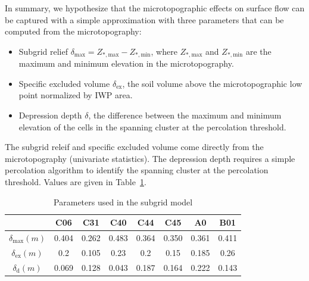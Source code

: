 \documentclass[review,11pt]{elsarticle}
\begin{document}
In summary, we hypothesize that the microtopographic effects on surface flow can be captured with a simple approximation with three parameters that can be computed from the microtopography:

\begin{itemize}
\item Subgrid relief $\delta_\text{max} = Z_{*,\text{max}} -   Z_{*,\text{min}}$, where  $Z_{*,\text{max}}$ and  $Z_{*,\text{min}}$ are the maximum and minimum elevation in the microtopography. 
\item Specific excluded volume $\delta_\text{ex}$, the soil volume above the microtopographic low point normalized by IWP area.
\item Depression depth $\delta$, the difference between the maximum and minimum elevation of the cells in the spanning cluster at the percolation threshold.
\end{itemize}
The subgrid releif and specific excluded volume come directly from the microtopography (univariate statistics). The depression depth requires a simple percolation algorithm to identify the spanning cluster at the percolation threshold. Values are given in Table~\ref{subgrid-para}.

\begin{center}
\begin{table}[htbp]
\caption{Parameters used in the subgrid model}\label{subgrid-para}
\begin{tabular}{| c |c|c|c|c|c|c|c|}
\hline
& C06 & C31 & C40 & C44 & C45 & A0 & B01 \\ \hline
 $\delta_\text{max}(m)$ & 0.404 & 0.262 & 0.483 & 0.364 & 0.350 & 0.361 & 0.411 \\ \hline
$\delta_\text{ex}(m)$ & 0.2 & 0.105 & 0.23 & 0.2 & 0.15 & 0.185 & 0.26\\ \hline
$ \delta_\text{d}(m)$ & 0.069 & 0.128 & 0.043 & 0.187 & 0.164 & 0.222 & 0.143 \\ \hline
\end{tabular}

\end{table}
\end{center}
\end{document}
